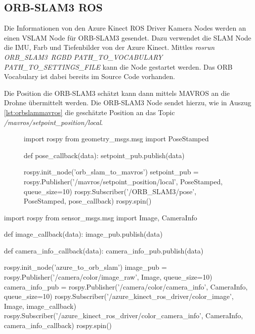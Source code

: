 \subsection{ORB-SLAM3 ROS}

Die Informationen von den Azure Kinect ROS Driver Kamera Nodes werden an einen \ac{VSLAM} Node für ORB-SLAM3 gesendet. Dazu verwendet die SLAM Node die \ac{IMU}, Farb und Tiefenbilder von der Azure Kinect.
Mittles \textit{rosrun ORB\_SLAM3\ RGBD PATH\_TO\_VOCABULARY PATH\_TO\_SETTINGS\_FILE} kann die Node gestartet werden.
Das ORB Vocabulary ist dabei bereits im Source Code vorhanden.
\cite[vgl.]{ORBSLAM3TRO}

Die Position die ORB-SLAM3 schätzt kann dann mittels MAVROS an die Drohne übermittelt werden.
Die ORB-SLAM3 Node sendet hierzu, wie in Auszug \ref{lst:orbslammavros} die geschätzte Position an das Topic \textit{/mavros/setpoint\_position/local}.

\begin{figure}
\begin{python}[breaklines=true, label=lst:orbslammavros,caption={ORB-SLAM3 Publisher zu MAVROS}]
import rospy
from geometry_msgs.msg import PoseStamped

def pose_callback(data):
    setpoint_pub.publish(data)

rospy.init_node('orb_slam_to_mavros')
setpoint_pub = rospy.Publisher('/mavros/setpoint_position/local', PoseStamped, queue_size=10)
rospy.Subscriber('/ORB_SLAM3/pose', PoseStamped, pose_callback)
rospy.spin()
\end{python}
\end{figure}



\begin{python}[breaklines=true,label=lst:azurepublish, caption={Azure Kamera Publisher zu ORB-SLAM3}]
    
import rospy
from sensor_msgs.msg import Image, CameraInfo

def image_callback(data):
    image_pub.publish(data)

def camera_info_callback(data):
    camera_info_pub.publish(data)

rospy.init_node('azure_to_orb_slam')
image_pub = rospy.Publisher('/camera/color/image_raw', Image, queue_size=10)
camera_info_pub = rospy.Publisher('/camera/color/camera_info', CameraInfo, queue_size=10)
rospy.Subscriber('/azure_kinect_ros_driver/color_image', Image, image_callback)
rospy.Subscriber('/azure_kinect_ros_driver/color_camera_info', CameraInfo, camera_info_callback)
rospy.spin()

\end{python}

